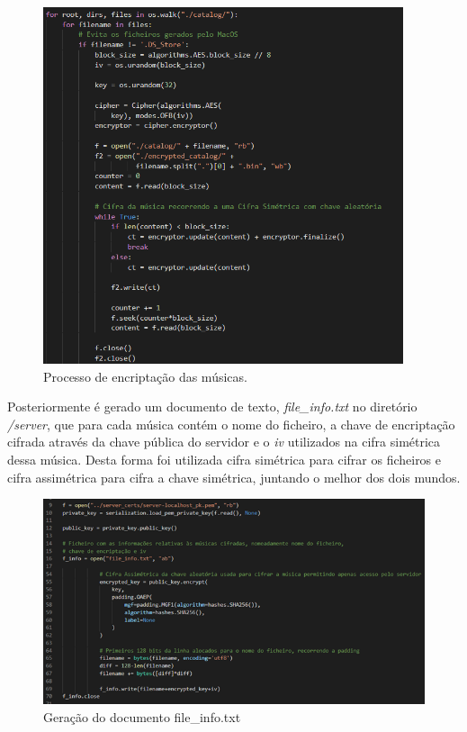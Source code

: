 \documentclass[10pt,english]{article}
\begin{document}
\begin{figure}[!h]
        \centering
        \includegraphics[width=400]{images/Encriptação das músicas.png}
        \caption{Processo de encriptação das músicas.}
\end{figure}

\par Posteriormente é gerado um documento de texto, \textit{file\_info.txt} no diretório \textit{/server}, que para cada música contém o nome do ficheiro, a chave de encriptação cifrada através da chave pública do servidor e o \textit{iv} utilizados na cifra simétrica dessa música. Desta forma foi utilizada cifra simétrica para cifrar os ficheiros e cifra assimétrica para cifra a chave simétrica, juntando o melhor dos dois mundos.

\begin{figure}[!h]
        \centering
        \includegraphics[width=500]{images/Geração de file info.png}
        \caption{Geração do documento file\_info.txt }
\end{figure}
\end{document}
